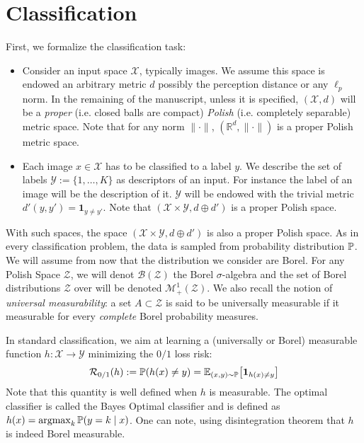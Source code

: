\section{Classification}
First, we formalize the classification task:
\begin{itemize}
    \item Consider an input space $\mathcal{X}$, typically images. We assume this space is endowed an arbitrary metric $d$ possibly the perception distance or any $\ell_p$ norm. In the remaining of the manuscript, unless it is specified, $(\mathcal{X},d)$ will be a \textit{proper} (i.e. closed balls are compact) \textit{Polish} (i.e. completely separable) metric space. Note that for any norm $\lVert\cdot\rVert$,  $(\mathbb{R}^d,\lVert\cdot\rVert)$ is a proper Polish metric space.
    \item Each image $x\in \mathcal{X}$ has to be classified to a label $y$. We describe the set of labels $\mathcal{Y}:=\{1,\dots,K\}$ as descriptors of an input. For instance the label of an image will be the description of it. $\mathcal{Y}$ will be endowed with the trivial metric  $d'(y,y') = \mathbf{1}_{y\neq y'}$. Note that $(\mathcal{X}\times\mathcal{Y},d\oplus d')$ is a proper Polish space.
\end{itemize}
With such spaces, the space $(\mathcal{X}\times\mathcal{Y},d\oplus d')$ is also a proper Polish space. As in every classification problem, the data is sampled from probability distribution $\mathbb{P}$. We will assume from now that the distribution we consider are Borel. For any Polish Space $\mathcal{Z}$, we will denot $\mathcal{B}(\mathcal{Z})$ the Borel $\sigma$-algebra and the set of Borel distributions $\mathcal{Z}$ over will be denoted $\mathcal{M}_+^1(\mathcal{Z})$. We also recall the notion of \textit{universal measurability}: a set $A\subset \mathcal{Z}$ is said to be universally measurable if it measurable for every \textit{complete} Borel probability measures.

In standard classification, we aim at learning a (universally or Borel) measurable function $h:\mathcal{X}\to\mathcal{Y}$ minimizing the $0/1$ loss risk:
\begin{align}
   \risk_{0/1}(h):=\PP(h(x)\neq y) = \EE_{(x,y)\sim\PP}\left[\mathbf{1}_{h(x)\neq y}\right]
\end{align}
Note that this quantity is well defined when $h$ is measurable. The optimal classifier is called the Bayes Optimal classifier and is defined as $h(x) = \operatorname*{argmax}_k\mathbb{P}(y=k\mid x)$. One can note, using disintegration theorem that $h$ is indeed Borel measurable.

